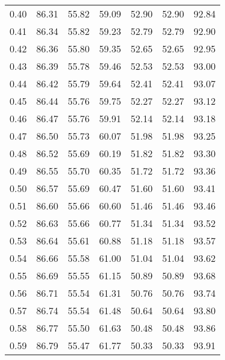 \begin{tabular}{|c|c|c|c|c|c|c|}
      0.40 &     86.31 &     55.82 &      59.09 &   52.90 &      52.90 &         92.84 \\
      0.41 &     86.34 &     55.82 &      59.23 &   52.79 &      52.79 &         92.90 \\
      0.42 &     86.36 &     55.80 &      59.35 &   52.65 &      52.65 &         92.95 \\
      0.43 &     86.39 &     55.78 &      59.46 &   52.53 &      52.53 &         93.00 \\
      0.44 &     86.42 &     55.79 &      59.64 &   52.41 &      52.41 &         93.07 \\
      0.45 &     86.44 &     55.76 &      59.75 &   52.27 &      52.27 &         93.12 \\
      0.46 &     86.47 &     55.76 &      59.91 &   52.14 &      52.14 &         93.18 \\
      0.47 &     86.50 &     55.73 &      60.07 &   51.98 &      51.98 &         93.25 \\
      0.48 &     86.52 &     55.69 &      60.19 &   51.82 &      51.82 &         93.30 \\
      0.49 &     86.55 &     55.70 &      60.35 &   51.72 &      51.72 &         93.36 \\
      0.50 &     86.57 &     55.69 &      60.47 &   51.60 &      51.60 &         93.41 \\
      0.51 &     86.60 &     55.66 &      60.60 &   51.46 &      51.46 &         93.46 \\
      0.52 &     86.63 &     55.66 &      60.77 &   51.34 &      51.34 &         93.52 \\
      0.53 &     86.64 &     55.61 &      60.88 &   51.18 &      51.18 &         93.57 \\
      0.54 &     86.66 &     55.58 &      61.00 &   51.04 &      51.04 &         93.62 \\
      0.55 &     86.69 &     55.55 &      61.15 &   50.89 &      50.89 &         93.68 \\
      0.56 &     86.71 &     55.54 &      61.31 &   50.76 &      50.76 &         93.74 \\
      0.57 &     86.74 &     55.54 &      61.48 &   50.64 &      50.64 &         93.80 \\
      0.58 &     86.77 &     55.50 &      61.63 &   50.48 &      50.48 &         93.86 \\
      0.59 &     86.79 &     55.47 &      61.77 &   50.33 &      50.33 &         93.91 \\

\end{tabular}
